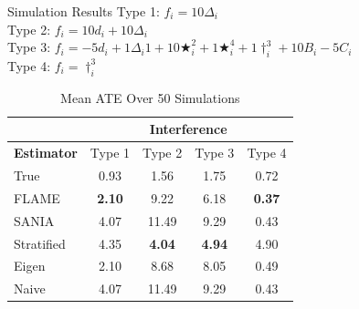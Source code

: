 \documentclass[newPxFont,numfooter,sectionpages]{beamer}
\begin{document}
\begin{frame}{Simulation Results}
Type 1: $f_i = 10\Delta_i$\\
Type 2: $f_i = 10d_i + 10\Delta_i$\\
Type 3: $f_i = -5d_i + 1\Delta_i1 + 10\bigstar_i^2 + 1\bigstar_i^4 + 1\dagger_i^3 + 10B_i -5C_i$\\
Type 4: $f_i = \dagger_i^3$
\begin{table}
\begin{tabular}{lllll}
\cline{2-5}
\multicolumn{1}{c}{\textbf{}}          & \multicolumn{4}{c}{\textbf{Interference}}                                                                                              \\ \hline
\multicolumn{1}{c}{\textbf{Estimator}} & \multicolumn{1}{c}{Type 1} & \multicolumn{1}{c}{Type 2} & \multicolumn{1}{c}{Type 3} & \multicolumn{1}{c}{Type 4}        \\ \hline
True              & \multicolumn{1}{c}{0.93}            & \multicolumn{1}{c}{1.56}          & \multicolumn{1}{c}{1.75}          & \multicolumn{1}{c}{0.72}          \\ \hline
FLAME             & \multicolumn{1}{c}{\textbf{2.10}}   & \multicolumn{1}{c}{9.22}          & \multicolumn{1}{c}{6.18} & \multicolumn{1}{c}{\textbf{0.37}} \\ \hline
SANIA             & \multicolumn{1}{c}{4.07}            & \multicolumn{1}{c}{11.49}         & \multicolumn{1}{c}{9.29} & \multicolumn{1}{c}{0.43} \\ \hline
Stratified        & \multicolumn{1}{c}{4.35}            & \multicolumn{1}{c}{\textbf{4.04}} & \multicolumn{1}{c}{\textbf{4.94}} & \multicolumn{1}{c}{4.90} \\ \hline
Eigen             & \multicolumn{1}{c}{2.10}            & \multicolumn{1}{c}{8.68}          & \multicolumn{1}{c}{8.05} & \multicolumn{1}{c}{0.49} \\ \hline
Naive             & \multicolumn{1}{c}{4.07}            & \multicolumn{1}{c}{11.49}         & \multicolumn{1}{c}{9.29} & \multicolumn{1}{c}{0.43}                             
\end{tabular}
\caption*{Mean ATE Over 50 Simulations}
\end{table}
\end{frame}
\end{document}
